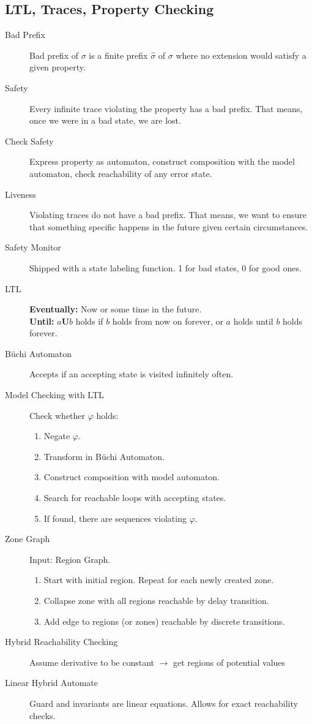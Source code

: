 \subsection*{LTL, Traces, Property Checking}

\begin{description}
	\item[Bad Prefix] Bad prefix of $\sigma$ is a finite prefix $\hat\sigma$ of
	$\sigma$ where no extension would satisfy a given property.
	\item[Safety] Every infinite trace violating the property has a bad prefix.
	That means, once we were in a bad state, we are lost.
	\item[Check Safety] Express property as automaton, construct composition with
	the model automaton, check reachability of any error state.
	\item[Liveness] Violating traces do not have a bad prefix. That means, we want
	to ensure that something specific happens in the future given certain
	circumstances.
	\item[Safety Monitor] Shipped with a state labeling function. 1 for bad states,
	0 for good ones.
	\item[LTL] \textbf{Eventually:} Now or some time in the future.\\
	\textbf{Until:} $a\textbf{U}b$ holds if $b$ holds from now on forever, or $a$
	holds until $b$ holds forever.
	\item[Büchi Automaton] Accepts if an accepting state is visited infinitely
	often.
	\item[Model Checking with LTL] Check whether $\varphi$ holds: 
	\begin{enumerate}
		\item Negate $\varphi$.
		\item Transform in Büchi Automaton.
		\item Construct composition with model automaton.
		\item Search for reachable loops with accepting states.
		\item If found, there are sequences violating $\varphi$.
	\end{enumerate}
	\item[Zone Graph] Input: Region Graph.
	\begin{enumerate}
		\item Start with initial region. Repeat for each newly created zone.
		\item Collapse zone with all regions reachable by delay transition. 
		\item Add edge to regions (or zones) reachable by discrete transitions.
	\end{enumerate}
	\item[Hybrid Reachability Checking] Assume derivative to be constant
	$\rightarrow$ get regions of potential values
	\item[Linear Hybrid Automate] Guard and invariants are linear equations. Allows
	for exact reachability checks.
\end{description}
